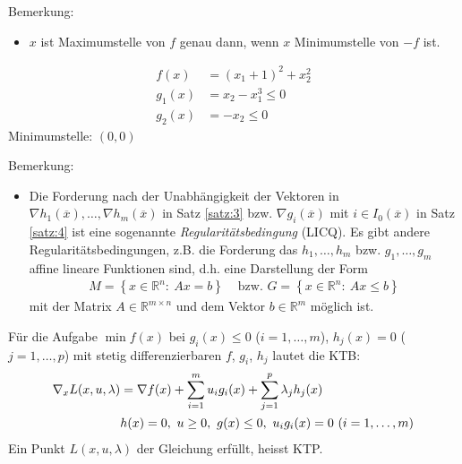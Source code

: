 Bemerkung:
\begin{itemize}
  \item[] $x$ ist Maximumstelle von $f$ genau dann, wenn $x$ Minimumstelle von $-f$ ist.  
\end{itemize} 
\begin{gegenexmp}\hspace{1cm}
\begin{minipage}{0.5\textwidth}
\begin{align*}
f(x) & = (x_1+1)^2+x^2_2\\
g_1(x) & = x_2-x^3_1 \le 0\\
g_2(x) & = -x_2 \le 0
\end{align*}
Minimumstelle: $(0,0)$
\end{minipage}
\begin{minipage}{0.5\textwidth}
\centering

\end{minipage}
\end{gegenexmp}
Bemerkung:
\begin{itemize}
  \item[] Die Forderung nach der Unabhängigkeit der Vektoren in $\nabla h_1(\overline{x}),\ldots,\nabla h_m(\overline{x})$ in Satz \ref{satz:3} bzw. $\nabla g_i(\overline{x})$ mit
  $i\in I_0(\overline{x})$ in Satz \ref{satz:4} ist eine sogenannte \textit{Regularitätsbedingung} (\ac{LICQ}). Es gibt andere Regularitätsbedingungen, z.B. die Forderung das
  $h_1,\ldots,h_m$ bzw. $g_1,\ldots,g_m$ affine lineare Funktionen sind, d.h. eine Darstellung der Form 
  \begin{align*}
  	M = \left\{ x\in\mathbb{R}^n:\ Ax=b \right\} & \text{ bzw. } G=\left\{ x\in\mathbb{R}^n:\ Ax\le b \right\}
  \end{align*}
  mit der Matrix $A\in\mathbb{R}^{m\times n}$ und dem Vektor $b\in\mathbb{R}^m$ möglich ist.
\end{itemize}
Für die Aufgabe $\min f(x)$ bei $g_i(x)\le 0$ ($i=1,\ldots,m$), $h_j(x)=0$ ($j=1,\ldots,p$) mit stetig differenzierbaren $f$, $g_i$, $h_j$ lautet die \ac{KTB}:
\begin{align}
	\nabla_x L(x,u,\lambda) & = \nabla f(x)+\sum\limits_{i=1}^m u_ig_i(x)+\sum\limits_{j=1}^p\lambda_j h_j(x) \label{eq:kap_1_ktp}\\
	& h(x) = 0,\ u\ge 0,\ g(x)\le 0,\ u_ig_i(x)=0\ (i=1,\ldots,m) \notag
\end{align}
Ein Punkt $L(x,u,\lambda)$ der Gleichung  erfüllt, heisst \ac{KTP}.

